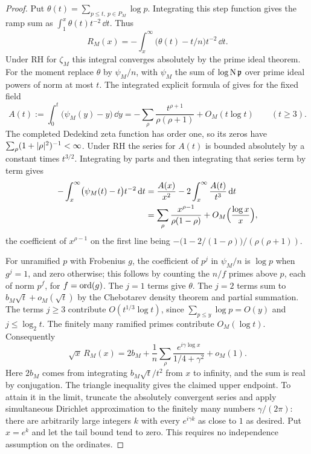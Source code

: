 \begin{proof}
Put $\theta(t)=\sum_{p\le t,\ p\in P_M}\log p$. Integrating this step function gives the
ramp sum as $\int_1^x\theta(t)t^{-2}\,\dd t$. Thus
\[
 R_M(x)=-\int_x^\infty\bigl(\theta(t)-t/n\bigr)t^{-2}\,\dd t .
\]
Under RH for $\zeta_M$ this integral converges absolutely by the prime ideal theorem. For
the moment replace $\theta$ by $\psi_M/n$, with $\psi_M$ the sum of $\log\operatorname{N}\mathfrak p$
over prime ideal powers of norm at most $t$. The integrated explicit formula of
\cite[(1.3a) and Lemma~3.3]{GrenieMolteni2016Smoothed} gives for the fixed field
\[
 A(t):=\int_0^t\bigl(\psi_M(y)-y\bigr)\,\dd y
 =-\sum_\rho\frac{t^{\rho+1}}{\rho(\rho+1)}+O_M(t\log t)\qquad(t\ge3).
\]
The completed Dedekind zeta function has order one, so its zeros have
$\sum_\rho(1+\lvert\rho\rvert^2)^{-1}<\infty$. Under RH the series for $A(t)$ is bounded absolutely
by a constant times $t^{3/2}$. Integrating by parts and then integrating that series term
by term gives
\begin{align*}
 -\int_x^\infty\bigl(\psi_M(t)-t\bigr)t^{-2}\,\mathrm{d} t
 &=\frac{A(x)}{x^2}-2\int_x^\infty\frac{A(t)}{t^3}\,\mathrm{d} t\\
 &=\sum_\rho\frac{x^{\rho-1}}{\rho(1-\rho)}+O_M\Bigl(\frac{\log x}x\Bigr),
\end{align*}
the coefficient of $x^{\rho-1}$ on the first line being
$-\bigl(1-2/(1-\rho)\bigr)/(\rho(\rho+1))$.

For unramified $p$ with Frobenius $g$, the coefficient of $p^j$ in $\psi_M/n$ is $\log p$
when $g^j=1$, and zero otherwise; this follows by counting the $n/f$ primes above $p$,
each of norm $p^f$, for $f=\operatorname{ord}(g)$. The $j=1$ terms give $\theta$. The $j=2$ terms sum
to $b_M\sqrt t+o_M(\sqrt t)$ by the Chebotarev density theorem and partial summation. The
terms $j\ge3$ contribute $O(t^{1/3}\log t)$, since $\sum_{p\le y}\log p=O(y)$ and
$j\le\log_2t$. The finitely many ramified primes contribute $O_M(\log t)$. Consequently
\begin{equation}\label{zer:eq:endpointexpansion}
 \sqrt x\,R_M(x)=2b_M+\frac1n\sum_\rho\frac{e^{i\gamma\log x}}{1/4+\gamma^2}+o_M(1).
\end{equation}
Here $2b_M$ comes from integrating $b_M\sqrt t/t^2$ from $x$ to infinity, and the sum is
real by conjugation. The triangle inequality gives the claimed upper endpoint. To attain it
in the limit, truncate the absolutely convergent series and apply simultaneous Dirichlet
approximation to the finitely many numbers $\gamma/(2\pi)$: there are arbitrarily large
integers $k$ with every $e^{i\gamma k}$ as close to $1$ as desired. Put $x=e^k$ and let the
tail bound tend to zero. This requires no independence assumption on the ordinates.


\end{proof}
